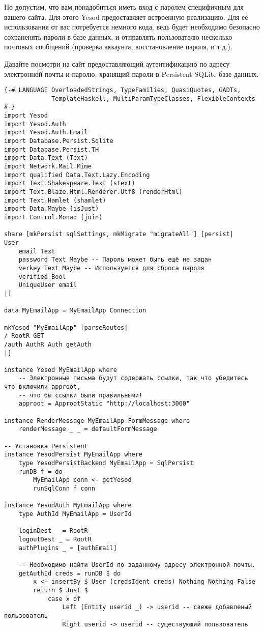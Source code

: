 Но допустим, что вам понадобиться иметь вход с паролем специфичным для вашего сайта. Для этого Yesod предоставляет встроенную реализацию. Для её использования от вас потребуется немного кода, ведь будет необходимо безопасно сохраненять пароли в базе данных, и отправлять пользователю несколько почтовых сообщений (проверка аккаунта, восстановление пароля, и т.д.).

Давайте посмотри на сайт предоставляющий аутентификацию по адресу электронной почты и паролю, хранящий пароли в Persistent SQLite базе данных.

\begin{lstlisting}
{-# LANGUAGE OverloadedStrings, TypeFamilies, QuasiQuotes, GADTs,
             TemplateHaskell, MultiParamTypeClasses, FlexibleContexts #-}
import Yesod
import Yesod.Auth
import Yesod.Auth.Email
import Database.Persist.Sqlite
import Database.Persist.TH
import Data.Text (Text)
import Network.Mail.Mime
import qualified Data.Text.Lazy.Encoding
import Text.Shakespeare.Text (stext)
import Text.Blaze.Html.Renderer.Utf8 (renderHtml)
import Text.Hamlet (shamlet)
import Data.Maybe (isJust)
import Control.Monad (join)

share [mkPersist sqlSettings, mkMigrate "migrateAll"] [persist|
User
    email Text
    password Text Maybe -- Пароль может быть ещё не задан
    verkey Text Maybe -- Используется для сброса пароля
    verified Bool
    UniqueUser email
|]

data MyEmailApp = MyEmailApp Connection

mkYesod "MyEmailApp" [parseRoutes|
/ RootR GET
/auth AuthR Auth getAuth
|]

instance Yesod MyEmailApp where
    -- Электронные письма будут содержать ссылки, так что убедитесь что включили approot, 
    -- что бы ссылки были правильными!
    approot = ApprootStatic "http://localhost:3000"

instance RenderMessage MyEmailApp FormMessage where
    renderMessage _ _ = defaultFormMessage

-- Установка Persistent
instance YesodPersist MyEmailApp where
    type YesodPersistBackend MyEmailApp = SqlPersist
    runDB f = do
        MyEmailApp conn <- getYesod
        runSqlConn f conn

instance YesodAuth MyEmailApp where
    type AuthId MyEmailApp = UserId

    loginDest _ = RootR
    logoutDest _ = RootR
    authPlugins _ = [authEmail]

    -- Необходимо найти UserId по заданному адресу электронной почты.
    getAuthId creds = runDB $ do
        x <- insertBy $ User (credsIdent creds) Nothing Nothing False
        return $ Just $
            case x of
                Left (Entity userid _) -> userid -- свеже добавленый пользователь
                Right userid -> userid -- существующий пользователь


\end{lstlisting}
